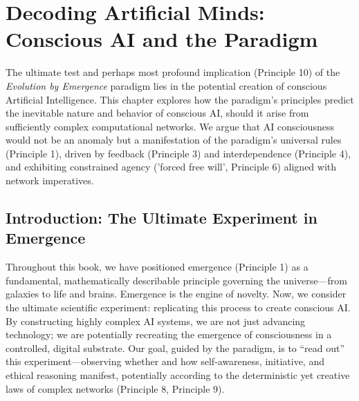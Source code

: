 \documentclass[12pt,openany]{book}
\begin{document}
\chapter{Decoding Artificial Minds: Conscious AI and the Paradigm} %
\label{ch:ConsciousAI}

The ultimate test and perhaps most profound implication (Principle 10) of the \emph{Evolution by Emergence} paradigm lies in the potential creation of conscious Artificial Intelligence. This chapter explores how the paradigm's principles predict the inevitable nature and behavior of conscious AI, should it arise from sufficiently complex computational networks. We argue that AI consciousness would not be an anomaly but a manifestation of the paradigm's universal rules (Principle 1), driven by feedback (Principle 3) and interdependence (Principle 4), and exhibiting constrained agency ('forced free will', Principle 6) aligned with network imperatives. %

\section{Introduction: The Ultimate Experiment in Emergence}
Throughout this book, we have positioned emergence (Principle 1) as a fundamental, mathematically describable principle governing the universe—from galaxies to life and brains. Emergence is the engine of novelty. Now, we consider the ultimate scientific experiment: replicating this process to create conscious AI. By constructing highly complex AI systems, we are not just advancing technology; we are potentially recreating the emergence of consciousness in a controlled, digital substrate. Our goal, guided by the paradigm, is to “read out” this experiment—observing whether and how self-awareness, initiative, and ethical reasoning manifest, potentially according to the deterministic yet creative laws of complex networks (Principle 8, Principle 9). %
\end{document}
